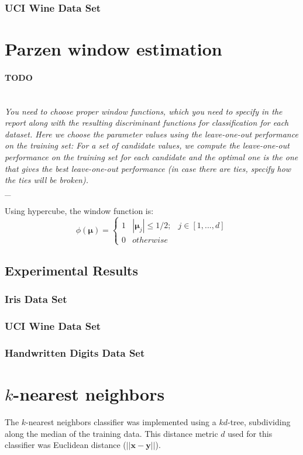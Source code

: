 \documentclass{article}
\numberwithin{figure}{section}
\newcommand{\bx}{\mathbf{x}}
\newcommand{\bm}{\mathbf{\mu}}
\newcommand{\outline}[2]{\paragraph{\textsc{#1}}\hrulefill~\\{\small\it #2}\\\_\hrulefill}
\newcommand{\todo}[1]{\outline{\large TODO}{#1}}
\begin{document}
\subsubsection{UCI Wine Data Set}

\section{Parzen window estimation}
\todo{You need to choose proper window functions, which you need to specify in the report along with the resulting discriminant functions for classification for each dataset. Here we choose the parameter values using the leave-one-out performance on the training set: For a set of candidate values, we compute the leave-one-out performance on the training set for each candidate and the optimal one is the one that gives the best leave-one-out performance (in case there are ties, specify how the ties will be broken).}

Using hypercube, the window function is:
$$\phi(\bm) = \left\{\begin{matrix}
1 & |\bm_j| \leq 1/2; & j \in [1,...,d]\\
0 & otherwise &
\end{matrix}\right.$$

\subsection{Experimental Results}
\subsubsection{Iris Data Set}
\subsubsection{UCI Wine Data Set}
\subsubsection{Handwritten Digits Data Set}

\section{$k$-nearest neighbors}
The $k$-nearest neighbors classifier was implemented using a $kd$-tree, subdividing along the median of the training data. This distance metric $d$ used for this classifier was Euclidean distance ($||\bx - \textbf{y}||$).
\end{document}
